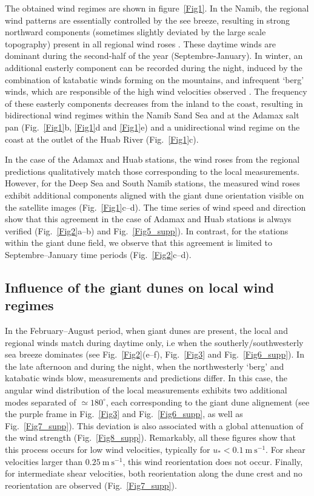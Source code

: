   The obtained wind regimes are shown in figure~\ref{Fig1}. In the Namib, the regional wind patterns are essentially controlled by the see breeze, resulting in strong northward components (sometimes slightly deviated by the large scale topography) present in all regional wind roses \citep{lancaster1985}. These daytime winds are dominant during the second-half of the year (Septembre-January). In winter, an additional easterly component can be recorded during the night, induced by the combination of katabatic winds forming on the mountains, and infrequent `berg' winds, which are responsible of the high wind velocities observed \citep{lancaster1984}. The frequency of these easterly components decreases from the inland to the coast, resulting in bidirectional wind regimes within the Namib Sand Sea and at the Adamax salt pan (Fig.~\ref{Fig1}b, \ref{Fig1}d and \ref{Fig1}e) and a unidirectional wind regime on the coast at the outlet of the Huab River (Fig.~\ref{Fig1}c).

  In the case of the Adamax and Huab stations, the wind roses from the regional predictions qualitatively match those corresponding to the local measurements. However, for the Deep Sea and South Namib stations, the measured wind roses exhibit additional components aligned with the giant dune orientation visible on the satellite images (Fig.~\ref{Fig1}c--d).
  The time series of wind speed and direction show that this agreement in the case of Adamax and Huab stations is always verified (Fig.~\ref{Fig2}a--b) and Fig.~\ref{Fig5_supp}). In contrast, for the stations within the giant dune field, we observe that this agreement is limited to Septembre--January time periods (Fig.~\ref{Fig2}c--d).

  \subsection{Influence of the giant dunes on local wind regimes}
  \label{section_data_feedback}

  In the February--August period, when giant dunes are present, the local and regional winds match during daytime only, i.e when the southerly/southwesterly sea breeze dominates (see Fig.~\ref{Fig2}(e--f), Fig.~\ref{Fig3} and Fig.~\ref{Fig6_supp}). In the late afternoon and during the night, when the northwesterly `berg' and katabatic winds blow, measurements and predictions differ. In this case, the angular wind distribution of the local measurements exhibits two additional modes separated of $\simeq 180^\circ$, each corresponding to the giant dune alignement (see the purple frame in Fig.~\ref{Fig3} and Fig.~\ref{Fig6_supp}, as well as Fig.~\ref{Fig7_supp}). This deviation is also associated with a global attenuation of the wind strength (Fig.~\ref{Fig8_supp}). Remarkably, all these figures show that this process occurs for low wind velocities, typically for $u_{*} < 0.1~\textrm{m}~\textrm{s}^{-1}$. For shear velocities larger than $0.25~\textrm{m}~\textrm{s}^{-1}$, this wind reorientation does not occur. Finally, for intermediate shear velocities, both reorientation along the dune crest and no reorientation are observed (Fig.~\ref{Fig7_supp}).


